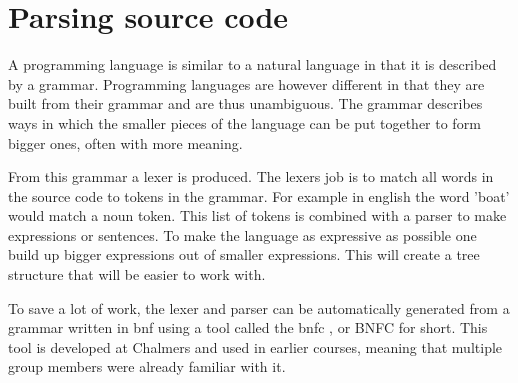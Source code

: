 \section{Parsing source code} \label{sec:bnfc}



A programming language is similar to a natural language in that it is described by a grammar. Programming languages are however different in that they are built from their grammar and are thus unambiguous.
The grammar describes ways in which the smaller pieces of the language can be put together to form bigger ones, often with more meaning. 

From this grammar a lexer is produced. The lexers job is to match all words in the source code to tokens in the grammar. For example in english the word 'boat' would match a noun token. This list of tokens is combined with a parser to make expressions or sentences. To make the language as expressive as possible one build up bigger expressions out of smaller expressions. This will create a tree structure that will be easier to work with. 

To save a lot of work, the lexer and parser can be automatically generated from a grammar written in \gls{bnf} using a tool called the \gls{bnfc} \cite{bnfc}, or BNFC for short. This tool is developed at Chalmers and used in earlier courses, meaning that multiple group members were already familiar with it.